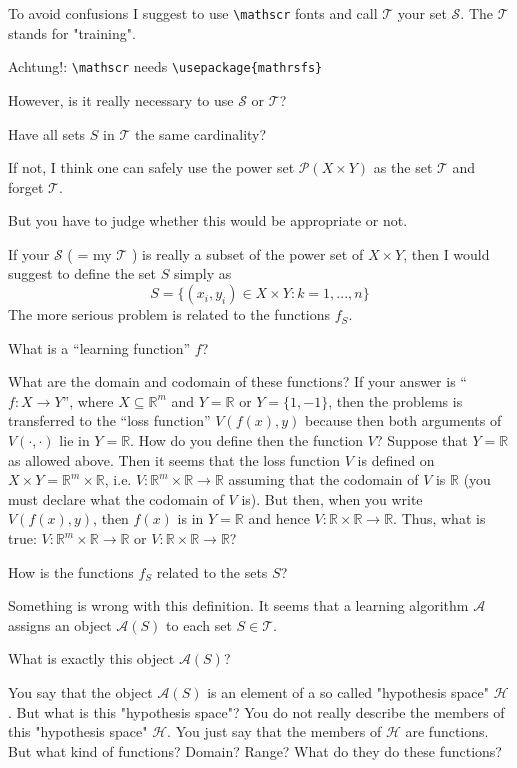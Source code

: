 \documentclass[12pt,reqno]{amsart}
\def\R{{\mathbb R }}
\def\red#1{{\color{red} #1}}
\begin{document}
\begin{description}[style=unboxed,leftmargin=0cm,itemsep=3ex]
To avoid confusions I suggest to use \verb!\mathscr! fonts and
call $\mathscr{T}$ your set $\mathcal{S}$.
The $\mathscr{T}$ stands for "training".

Achtung!: \verb!\mathscr! needs \verb!\usepackage{mathrsfs}!

However, is it really necessary to use $\mathcal{S}$ or $\mathscr{T}$?

Have all sets $S$ in $\mathscr{T}$ the same cardinality?

If not, I think one can safely use the power set $\mathscr{P}(X\times Y)$
as the set $\mathscr{T}$ and forget $\mathscr{T}$.

But you have to judge whether this would be appropriate or not.

If your $\mathcal{S}$ ( = my $\mathscr{T}$ ) is really a subset of the
power set of $X\times Y$, then I would suggest to define the set $S$
simply as
$$
S = \{ (x_i,y_i)\in X\times Y : k=1,...,n \}
$$
The more serious problem is related to the functions $f_S$.

What is a \red{``learning function''} $f$?

What are the domain and codomain of these functions?
If your answer is ``$f:X\to Y$'', where $X\subseteq\R^m$ and $Y=\R$ or
$Y=\{1,-1\}$, then the problems is transferred to the ``loss function''
$V(f(x),y)$ because then both arguments of $V(\cdot,\cdot)$ lie in $Y=\R$.
How do you define then the function $V$?
Suppose that $Y=\R$ as allowed above.
Then it seems that the loss function $V$ is defined on
$X\times Y=\R^m\times\R$, i.e. $V:\R^m\times\R\to\R$ assuming that the
codomain of $V$ is $\R$ (you must declare what the codomain of $V$ is).
But then, when you write $V(f(x),y)$, then $f(x)$ is in $Y=\R$ and
hence $V:\R\times\R\to\R$.
Thus, what is true: $V:\R^m\times\R\to\R$ or $V:\R\times\R\to\R$?

How is the functions $f_S$ related to the sets $S$?


Something is wrong with this definition. 
It seems that a learning algorithm $\mathcal{A}$ assigns an object
$\mathcal{A}(S)$ to each set $S\in\mathscr{T}$.
          
What is exactly this object $\mathcal{A}(S)$? 

You say that the object $\mathcal{A}(S)$ is an element of a so called
"hypothesis space" $\mathcal{H}$.
But what is this "hypothesis space"?
You do not really describe the members of this "hypothesis space"
$\mathcal{H}$.
You just say that the members of $\mathcal{H}$ are functions.
But what kind of functions? Domain? Range? What do they do these
functions?


\end{description}
\end{document}
